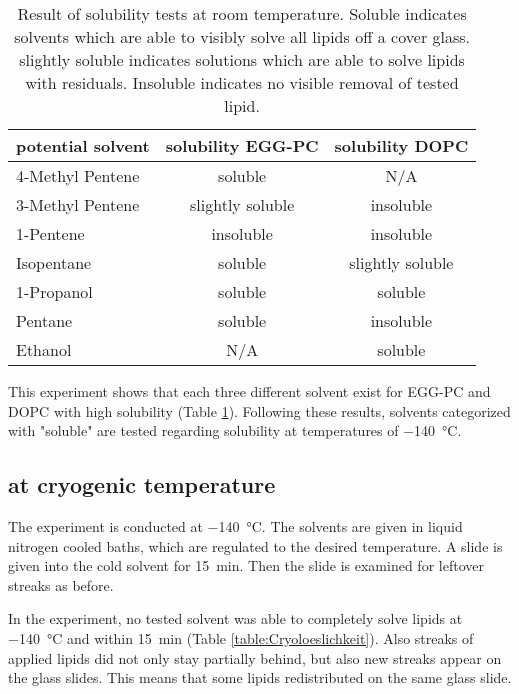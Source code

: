 \begin{table}[hbt!]
	\centering
	\begin{tabular}{|l|c|c|}
		\hline
		potential solvent & solubility EGG-PC & solubility DOPC \\
		\hline
		\hline
		4-Methyl Pentene & soluble & N/A  \\ 
		\hline
		3-Methyl Pentene & slightly soluble & insoluble \\
		\hline
		1-Pentene & insoluble & insoluble \\
		\hline
		Isopentane & soluble & slightly soluble\\
		\hline
		1-Propanol & soluble & soluble\\
		\hline
		Pentane & soluble & insoluble\\
		\hline
		Ethanol & N/A & soluble\\
		\hline
	\end{tabular}
	\caption{Result of solubility tests at room temperature. Soluble indicates solvents which are able to visibly solve all lipids off a cover glass. slightly soluble indicates solutions which are able to solve lipids with residuals. Insoluble indicates no visible removal of tested lipid.}
	\label{table:LoeslichkeitRaumtemperatur}
\end{table}

This experiment shows that each three different solvent exist for EGG-PC and DOPC with high solubility (Table \ref{table:LoeslichkeitRaumtemperatur}). Following these results, solvents categorized with "soluble" are tested regarding solubility at temperatures of \SI{-140}{\degreeCelsius}. 

\subsection{at cryogenic temperature}
\label{chapter:meltingtemp}

The experiment is conducted at \SI{-140}{\degreeCelsius}. The solvents are given in liquid nitrogen cooled baths, which are regulated to the desired temperature. A slide is given into the cold solvent for \SI{15}{\minute}. Then the slide is examined for leftover streaks as before.

In the experiment, no tested solvent was able to completely solve lipids at \SI{-140}{\degreeCelsius} and within \SI{15}{\minute} (Table \ref{table:Cryoloeslichkeit}). Also streaks of applied lipids did not only stay partially behind, but also new streaks appear on the glass slides. This means that some lipids redistributed on the same glass slide.

